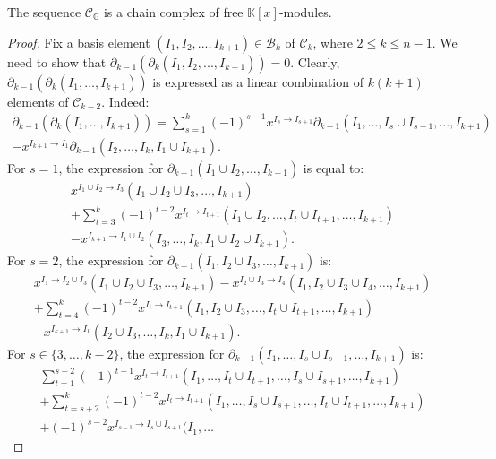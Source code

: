 \documentclass[ALCO]{cedram}
\newcommand{\mbk}{\mbox{$\mathbb{K}$}}
\newcommand{\mcb}{\mbox{$\mathcal{B}$}}
\newcommand{\mcc}{\mbox{$\mathcal{C}$}}
\newcommand{\dif}{\mbox{$\partial$}}
\begin{document}
\begin{proposition}\label{chain-complex}
The sequence $\mcc_{\mathbb{G}}$ is a chain complex of free
$\mbk[x]$-modules.
\end{proposition}
\begin{proof}
Fix a basis element $(I_1,I_2,...,I_{k+1})\in \mcb_k$ of $\mcc_k$,
where $2\leq k\leq n-1$.  We need to show that
$\dif_{k-1}(\dif_{k}(I_{1} ,I_{2},...,I_{k+1}))=0$.  Clearly,
$\dif_{k-1}(\dif_{k}(I_1,\ldots,I_{k+1}))$ is expressed as a linear
combination of $k(k+1)$ elements of $\mcc_{k-2}$. Indeed:
\begin{multline}\label{dd}
\dif_{k-1}(\dif_{k}(I_1,\ldots,I_{k+1}))=   \sum_{s=1}^{k}(-1)^{s-1}x^{I_s\to I_{s+1}}\dif_{k-1}(I_1,\ldots
  ,I_s\cup I_{s+1},\ldots ,I_{k+1}) \\  -x^{I_{k+1}\to
    I_1}\dif_{k-1}(I_2,\ldots,I_{k},I_1\cup I_{k+1}).
\end{multline}
For $s=1$, the expression for $\dif_{k-1}(I_1\cup
I_2,\ldots ,I_{k+1})$ is equal to:
\begin{multline}\label{s=1}
 x^{I_1\cup I_2\to I_3}(I_1\cup I_2\cup I_3,\ldots ,I_{k+1})\\+
  \sum_{t=3}^{k}(-1)^{t-2}x^{I_t\to I_{t+1}}(I_1\cup I_2,\ldots
  ,I_t\cup I_{t+1},\ldots ,I_{k+1}) \\-x^{I_{k+1}\to
    I_{1}\cup I_2}(I_3,\ldots ,I_{k},I_1\cup I_2\cup I_{k+1}). 
\end{multline}
For $s=2$, the expression for $\dif_{k-1}(I_1, I_2\cup I_3,\ldots
,I_{k+1})$ is:
\begin{multline}\label{s=2}
x^{I_1\to I_2\cup I_3}(I_1\cup I_2\cup I_3,\ldots ,I_{k+1}) -x^{I_2\cup I_3\to I_4}(I_1,I_2\cup I_3\cup I_4,\ldots,I_{k+1})  \\ + \sum_{t=4}^{k}(-1)^{t-2}x^{I_t\to I_{t+1}}(I_1,I_2\cup
  I_3,\ldots ,I_t\cup I_{t+1},\ldots ,I_{k+1}) \\
  -x^{I_{k+1}\to I_{1}}(I_2\cup I_3,\ldots ,I_{k},I_1\cup
  I_{k+1}).
\end{multline}
For $s\in\{3,\ldots ,k-2\}$, the expression for $\dif_{k-1}(I_1,\ldots
,I_s\cup I_{s+1},\ldots ,I_{k+1})$ is:
\begin{multline}\label{s=3tok-2}
\sum_{t=1}^{s-2}(-1)^{t-1}x^{I_t\to I_{t+1}}(I_1,\ldots ,I_t\cup
  I_{t+1},\ldots , I_s\cup I_{s+1},\ldots ,I_{k+1})
  \\+\sum_{t=s+2}^{k}(-1)^{t-2}x^{I_t\to I_{t+1}}(I_1,\ldots
  ,I_s\cup I_{s+1},\ldots , I_t\cup I_{t+1},\ldots ,I_{k+1})
  \\+(-1)^{s-2}x^{I_{s-1}\to I_{s}\cup I_{s+1}}(I_1,\ldots

\end{multline}
\end{proof}
\end{document}

